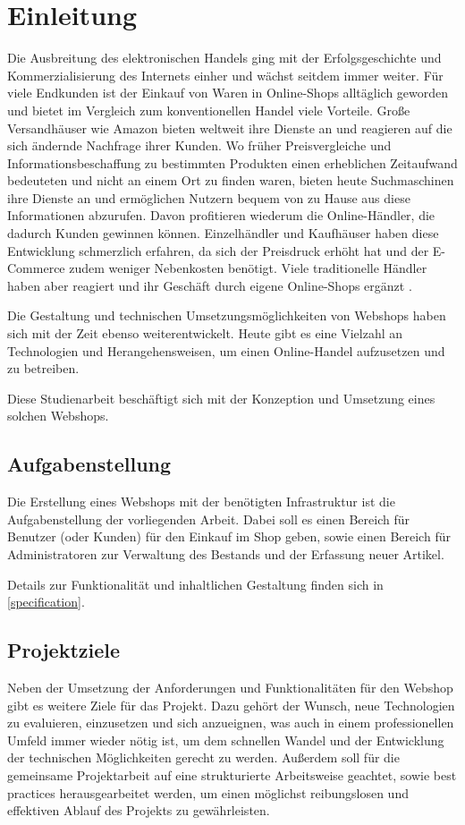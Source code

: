 \section{Einleitung} \thispagestyle{nomarkstyle}
Die Ausbreitung des elektronischen Handels ging mit der Erfolgsgeschichte und Kommerzialisierung des Internets einher und wächst seitdem immer weiter.
Für viele Endkunden ist der Einkauf von Waren in Online-Shops alltäglich geworden und bietet im Vergleich zum konventionellen Handel viele Vorteile.
Große Versandhäuser wie Amazon bieten weltweit ihre Dienste an und reagieren auf die sich ändernde Nachfrage ihrer Kunden.
Wo früher Preisvergleiche und Informationsbeschaffung zu bestimmten Produkten einen erheblichen Zeitaufwand bedeuteten und nicht an einem Ort zu finden waren, bieten heute Suchmaschinen ihre Dienste an und ermöglichen Nutzern bequem von zu Hause aus diese Informationen abzurufen.
Davon profitieren wiederum die Online-Händler, die dadurch Kunden gewinnen können.
Einzelhändler und Kaufhäuser haben diese Entwicklung schmerzlich erfahren, da sich der Preisdruck erhöht hat und der E-Commerce zudem weniger Nebenkosten benötigt.
Viele traditionelle Händler haben aber reagiert und ihr Geschäft durch eigene Online-Shops ergänzt \cite{Riehm2004}. 

Die Gestaltung und technischen Umsetzungsmöglichkeiten von Webshops haben sich mit der Zeit ebenso weiterentwickelt.
Heute gibt es eine Vielzahl an Technologien und Herangehensweisen, um einen Online-Handel aufzusetzen und zu betreiben.

Diese Studienarbeit beschäftigt sich mit der Konzeption und Umsetzung eines solchen Webshops.

\subsection{Aufgabenstellung}
Die Erstellung eines Webshops mit der benötigten Infrastruktur ist die Aufgabenstellung der vorliegenden Arbeit.
Dabei soll es einen Bereich für Benutzer (oder Kunden) für den Einkauf im Shop geben, sowie einen Bereich für Administratoren zur Verwaltung des Bestands und der Erfassung neuer Artikel.

Details zur Funktionalität und inhaltlichen Gestaltung finden sich in \cref{specification}.
\subsection{Projektziele}
Neben der Umsetzung der Anforderungen und Funktionalitäten für den Webshop gibt es weitere Ziele für das Projekt.
Dazu gehört der Wunsch, neue Technologien zu evaluieren, einzusetzen und sich anzueignen, was auch in einem professionellen Umfeld immer wieder nötig ist, um dem schnellen Wandel und der Entwicklung der technischen Möglichkeiten gerecht zu werden.
Außerdem soll für die gemeinsame Projektarbeit auf eine strukturierte Arbeitsweise geachtet, sowie best practices herausgearbeitet werden, um einen möglichst reibungslosen und effektiven Ablauf des Projekts zu gewährleisten.
